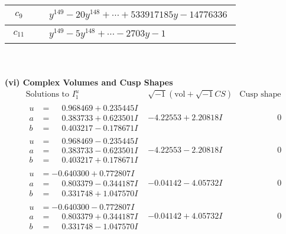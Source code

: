 \documentclass[1p]{elsarticle_modified}
\theoremstyle{definition}
\newcommand{\I}{\sqrt{-1}}
\begin{document}
\begin{tabular}{m{50pt}|m{274pt}}
\hline $$\begin{aligned}c_{9}\end{aligned}$$&$\begin{aligned}
&y^{149}-20 y^{148}+\cdots+533917185 y-14776336
\end{aligned}$\\
\hline $$\begin{aligned}c_{11}\end{aligned}$$&$\begin{aligned}
&y^{149}-5 y^{148}+\cdots-2703 y-1
\end{aligned}$\\
\hline
\end{tabular}\\~\\
\newpage\flushleft \textbf{(vi) Complex Volumes and Cusp Shapes}
$$\begin{array}{c|c|c}  
\text{Solutions to }I^u_{1}& \I (\text{vol} + \sqrt{-1}CS) & \text{Cusp shape}\\
 \hline 
\begin{aligned}
u &= \phantom{-}0.968469 + 0.235445 I \\
a &= \phantom{-}0.383733 + 0.623501 I \\
b &= \phantom{-}0.403217 - 0.178671 I\end{aligned}
 & -4.22553 + 2.20818 I & \phantom{-0.000000 } 0 \\ \hline\begin{aligned}
u &= \phantom{-}0.968469 - 0.235445 I \\
a &= \phantom{-}0.383733 - 0.623501 I \\
b &= \phantom{-}0.403217 + 0.178671 I\end{aligned}
 & -4.22553 - 2.20818 I & \phantom{-0.000000 } 0 \\ \hline\begin{aligned}
u &= -0.640300 + 0.772807 I \\
a &= \phantom{-}0.803379 - 0.344187 I \\
b &= \phantom{-}0.331748 + 1.047570 I\end{aligned}
 & -0.04142 - 4.05732 I & \phantom{-0.000000 } 0 \\ \hline\begin{aligned}
u &= -0.640300 - 0.772807 I \\
a &= \phantom{-}0.803379 + 0.344187 I \\
b &= \phantom{-}0.331748 - 1.047570 I\end{aligned}
 & -0.04142 + 4.05732 I & \phantom{-0.000000 } 0 \\ \hline\begin{aligned}

\end{aligned}
\end{array}$$
\end{document}
